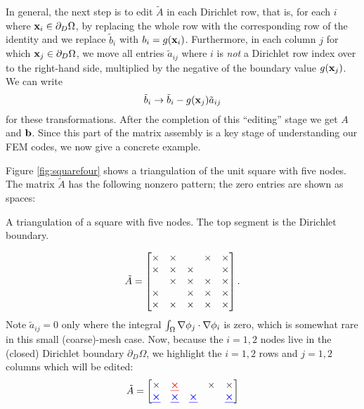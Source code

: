 In general, the next step is to edit $\tilde A$ in each Dirichlet row, that is, for each $i$ where $\mathbf{x}_i \in \partial_D \Omega$, by replacing the whole row with the corresponding row of the identity and we replace $\tilde b_i$ with $b_i = g(\mathbf{x}_i)$.  Furthermore, in each column $j$ for which $\mathbf{x}_j \in \partial_D \Omega$, we move all entries $\tilde a_{ij}$ where $i$ is \emph{not} a Dirichlet row index over to the right-hand side, multiplied by the negative of the boundary value $g(\mathbf{x}_{j})$.  We can write
    $$\tilde b_i \to \tilde b_i - g(\mathbf{x}_{j}) \tilde a_{ij}$$
for these transformations.  After the completion of this ``editing'' stage we get $A$ and $\mathbf{b}$.  Since this part of the matrix assembly is a key stage of understanding our FEM codes, we now give a concrete example.

\medskip\noindent\hrulefill
\begin{example} Figure \ref{fig:squarefour} shows a triangulation of the unit square with five nodes.  The matrix $\tilde A$ has the following nonzero pattern; the zero entries are shown as spaces:\begin{marginfigure}

\caption{A triangulation of a square with five nodes.  The top segment is the Dirichlet boundary.}
\label{fig:squarefour}
\end{marginfigure}%
\begin{equation*}
\tilde A = \begin{bmatrix}
\times & \times &    & \times & \times \\
\times & \times & \times &    & \times \\
   & \times & \times & \times & \times \\
\times &    & \times & \times & \times \\
\times & \times & \times & \times & \times
\end{bmatrix}.
\end{equation*}
Note $\tilde a_{ij}=0$ only where the integral $\int_\Omega \nabla \phi_j \cdot \nabla \phi_i$ is zero, which is somewhat rare in this small (coarse)-mesh case.  Now, because the $i=1,2$ nodes live in the (closed) Dirichlet boundary $\partial_D \Omega$, we highlight the $i=1,2$ rows and $j=1,2$ columns which will be edited:
\begin{equation*}
\tilde A = \begin{bmatrix}
\times & {\color{red} \bm{\underline{\times}}} &    & \times & \times \\
{\color{blue} \bm{\underline{\times}}} & {\color{blue} \bm{\underline{\times}}} & {\color{blue} \bm{\underline{\times}}} &    & {\color{blue} \bm{\underline{\times}}} \\

\end{bmatrix}
\end{equation*}
\end{example}
